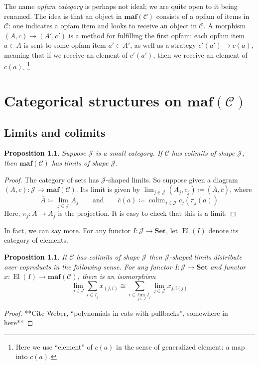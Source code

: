\documentclass[11pt, one side, article]{memoir}
\theoremstyle{definition}
\theoremstyle{plain}
\newtheorem{proposition}[definitionx]{Proposition}
\DeclareMathOperator*{\colim}{colim}
\DeclareMathOperator{\el}{El}
\newcommand{\cat}[1]{\mathcal{#1}}%
\newcommand{\Cat}[1]{\mathbf{#1}}%
\newcommand{\ol}[1]{\overline{#1}}
\newcommand{\smset}{\Cat{Set}}
\newcommand{\0}{\Cat{0}}
\newcommand{\1}{\Cat{1}}
\newcommand{\opfam}{\Cat{maf}}
\newcommand{\qqand}{\qquad\text{and}\qquad}
\begin{document}
The name \emph{opfam category} is perhaps not ideal; we are quite open to it being renamed. The idea is that an object in $\opfam(\cat{C})$ consists of a opfam of items in $\cat{C}$: one indicates a opfam item and looks to receive an object in $\cat{C}$. A morphism $(A,c)\to (A',c')$ is a method for fulfilling the first opfam: each opfam item $a\in A$ is sent to some opfam item $a'\in A'$, as well as a strategy $c'(a')\to c(a)$, meaning that if we receive an element of $c'(a')$, then we receive an element of $c(a)$.%
\footnote{Here we use ``element'' of $c(a)$ in the sense of generalized element: a map into $c(a)$.}






\chapter{Categorical structures on $\opfam(\cat{C})$}

\section{Limits and colimits}

\begin{proposition}\label{prop.colimits_to_limits}
Suppose $\cat{J}$ is a small category. If $\cat{C}$ has colimits of shape $\cat{J}$, then $\opfam(\cat{C})$ has limits of shape $\cat{J}$. 
\end{proposition}
\begin{proof}
	The category of sets has $\cat{J}$-shaped limits. So suppose given a diagram $(A,c)\colon \cat{J}\to \opfam(\cat{C})$. Its limit is given by $\lim_{j\in \cat{J}}(A_j,c_j)\coloneqq(\ol{A},\ol{c})$, where
	\[
	\ol{A}\coloneqq\lim_{j\in \cat{J}}A_j
	\qqand
	\ol{c}(a)\coloneqq\colim_{j\in \cat{J}}c_j(\pi_j(a))
	\]
	Here, $\pi_j\colon \ol{A}\to A_j$ is the projection. It is easy to check that this is a limit.
\end{proof}

In fact, we can say more. For any functor $I\colon\cat{J}\to\smset$, let $\el(I)$ denote its category of elements.

\begin{proposition}
It $\cat{C}$ has colimits of shape $\cat{J}$ then $\cat{J}$-shaped limits distribute over coproducts in the following sense. For any functor $I\colon\cat{J}\to\smset$ and functor $x\colon\el(I)\to\opfam(\cat{C})$, there is an isomorphism
\[
\lim_{j\in J}\sum_{i\in I_j}x_{(j,i)}\cong\sum_{i\in\lim_{j\in J}I_j}\lim_{j\in \cat{J}}x_{j,i(j)}
\]
\end{proposition}
\begin{proof}
**Cite Weber, ``polynomials in cats with pullbacks'', somewhere in here**
\end{proof}
\end{document}

